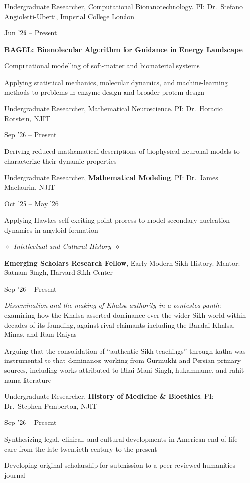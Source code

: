 \documentclass[10pt,a4paper]{article}
\newlength{\entrygap}\setlength{\entrygap}{5pt}
\newcommand{\entry}[2]{%
  \par\vspace{\entrygap}%
  \noindent
  \begin{minipage}[t]{0.795\textwidth}\raggedright #1\end{minipage}%
  \hfill
  \begin{minipage}[t]{0.19\textwidth}\raggedleft\small #2\end{minipage}%
  \par\penalty500
}
\newcommand{\subhead}[1]{%
  \par\vspace{10pt}\noindent$\diamond$\ {\fontsize{11}{13}\selectfont\itshape #1}\ $\diamond$\par\vspace{3pt}}
\begin{document}
\entry{Undergraduate Researcher, Computational Bionanotechnology. PI: Dr.~Stefano Angioletti-Uberti, Imperial College London}{Jun '26 -- Present}
\begin{cvitems}
  \item \textbf{BAGEL: Biomolecular Algorithm for Guidance in Energy Landscape}
  \item Computational modelling of soft-matter and biomaterial systems
  \item Applying statistical mechanics, molecular dynamics, and machine-learning methods to problems in enzyme design and broader protein design
\end{cvitems}

\entry{Undergraduate Researcher, Mathematical Neuroscience. PI: Dr.~Horacio Rotstein, NJIT}{Sep '26 -- Present}
\begin{cvitems}
  \item Deriving reduced mathematical descriptions of biophysical neuronal models to characterize their dynamic properties
\end{cvitems}

\entry{Undergraduate Researcher, \textbf{Mathematical Modeling}. PI: Dr.~James Maclaurin, NJIT}{Oct '25 -- May '26}
\begin{cvitems}
  \item Applying Hawkes self-exciting point process to model secondary nucleation dynamics in amyloid formation
\end{cvitems}

\subhead{Intellectual and Cultural History}
\entry{\textbf{Emerging Scholars Research Fellow}, Early Modern Sikh History. Mentor: Satnam Singh, Harvard Sikh Center}{Sep '26 -- Present}
\begin{cvitems}
  \item \textit{Dissemination and the making of Khalsa authority in a contested panth}: examining how the Khalsa asserted dominance over the wider Sikh world within decades of its founding, against rival claimants including the Bandai Khalsa, Minas, and Ram Raiyas
  \item Arguing that the consolidation of ``authentic Sikh teachings'' through katha was instrumental to that dominance; working from Gurmukhi and Persian primary sources, including works attributed to Bhai Mani Singh, hukamname, and rahit-nama literature
\end{cvitems}

\entry{Undergraduate Researcher, \textbf{History of Medicine \& Bioethics}. PI: Dr.~Stephen Pemberton, NJIT}{Sep '26 -- Present}
\begin{cvitems}
  \item Synthesizing legal, clinical, and cultural developments in American end-of-life care from the late twentieth century to the present
  \item Developing original scholarship for submission to a peer-reviewed humanities journal
\end{cvitems}
\end{document}
